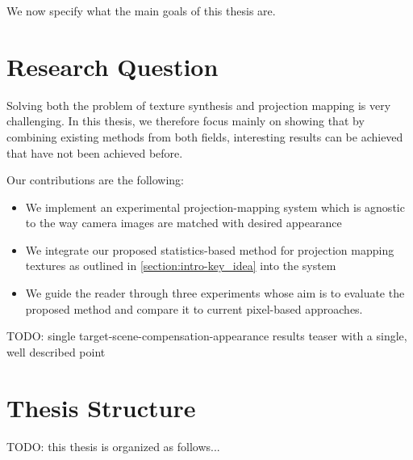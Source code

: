 We now specify what the main goals of this thesis are.

\section{Research Question}
\label{section:intro-research_question}

Solving both the problem of texture synthesis and projection mapping is very challenging. In this thesis, we therefore focus mainly on showing that by combining existing methods from both fields, interesting results can be achieved that have not been achieved before.

Our contributions are the following:

\begin{itemize}
    \item We implement an experimental projection-mapping system which is agnostic to the way camera images are matched with desired appearance
    \item We integrate our proposed statistics-based method for projection mapping textures as outlined in \ref{section:intro-key_idea} into the system
    \item We guide the reader through three experiments whose aim is to evaluate the proposed method and compare it to current pixel-based approaches.
\end{itemize}

{\color{red} TODO: single target-scene-compensation-appearance results teaser with a single, well described point}

\section{Thesis Structure}
\label{section:intro-thesis_structure}

{\color{red} TODO: this thesis is organized as follows...}
